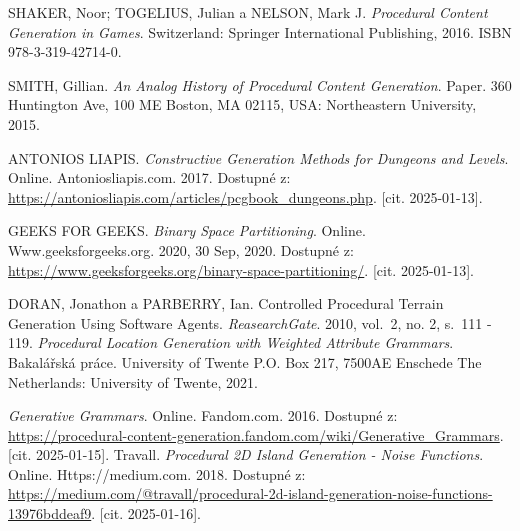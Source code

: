 \begin{thebibliography}{99}   
    SHAKER, Noor; TOGELIUS, Julian a NELSON, Mark J. \textit{Procedural Content Generation in Games}. Switzerland: Springer International Publishing, 2016. ISBN 978-3-319-42714-0.

    SMITH, Gillian. \textit{An Analog History of Procedural Content Generation}. Paper. 360 Huntington Ave, 100 ME Boston, MA 02115, USA: Northeastern University, 2015.

    ANTONIOS LIAPIS. \textit{Constructive Generation Methods for Dungeons and Levels}. Online. Antoniosliapis.com. 2017. Dostupné z: \url{https://antoniosliapis.com/articles/pcgbook\_dungeons.php}. [cit. 2025-01-13].

    GEEKS FOR GEEKS. \textit{Binary Space Partitioning}. Online. Www.geeksforgeeks.org. 2020, 30 Sep, 2020. Dostupné z: \url{https://www.geeksforgeeks.org/binary-space-partitioning/}. [cit. 2025-01-13].


    DORAN, Jonathon a PARBERRY, Ian. Controlled Procedural Terrain Generation Using Software Agents. \textit{ReasearchGate}. 2010, vol.~2, no. 2, s.~111 - 119.
    \textit{Procedural Location Generation with Weighted Attribute Grammars}. Bakalářská práce. University of Twente P.O. Box 217, 7500AE Enschede The Netherlands: University of Twente, 2021.

    \textit{Generative Grammars}. Online. Fandom.com. 2016. Dostupné z: \url{https://procedural-content-generation.fandom.com/wiki/Generative\_Grammars}. [cit. 2025-01-15].
    Travall. \textit{Procedural 2D Island Generation - Noise Functions}. Online. Https://medium.com. 2018. Dostupné z: \url{https://medium.com/@travall/procedural-2d-island-generation-noise-functions-13976bddeaf9}. [cit. 2025-01-16].


\end{thebibliography}

